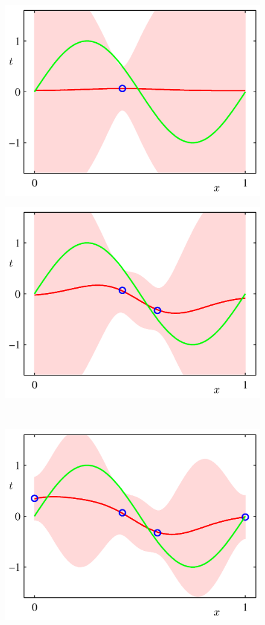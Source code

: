 \documentclass[b5paper]{book}
\numberwithin{equation}{chapter}
\begin{document}
{\begin{figure}[H]
\begin{minipage}[t]{0.5\linewidth}
		\includegraphics[scale=0.8]{Images/3-8a.png}
		\label{fig:3-8a}
		\end{minipage}
		\begin{minipage}[t]{0.5\linewidth}
		\centering
		\includegraphics[scale=0.8]{Images/3-8b.png}
		\label{fig:3-8b}
		\end{minipage}\\
		\begin{minipage}[t]{0.5\linewidth}
		\centering
		\includegraphics[scale=0.8]{Images/3-8c.png}

\end{minipage}
\end{figure}}
\end{document}
